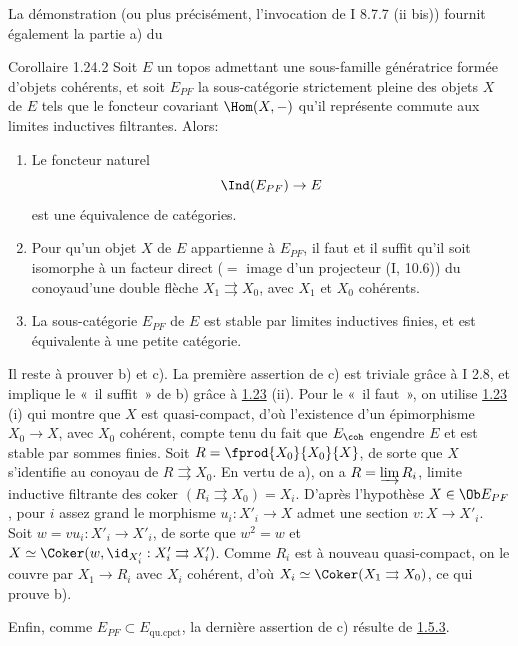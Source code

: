 La démonstration (ou plus précisément, l'invocation de I 8.7.7 (ii
bis)) fournit également la partie a) du

\begin{enonce*}{Corollaire 1.24.2}
Soit $E$ un topos admettant une sous-famille génératrice formée
d'objets cohérents, et soit $E_{PF}$ la sous-catégorie strictement
pleine des objets $X$ de $E$ tels que le foncteur covariant $\Hom(X,
-)$ qu'il représente commute aux limites inductives filtrantes.
Alors:
\begin{enumerate}
\renewcommand{\theenumi}{\alph{enumi}}
\renewcommand{\labelenumi}{\theenumi)}
\item Le foncteur naturel
$$
\Ind (E_{PF}) \to E
$$
est une équivalence de catégories.

\item Pour qu'un objet $X$ de $E$ appartienne à $E_{PF}$, il faut et
  il suffit qu'il soit isomorphe à un facteur direct ($=$ image d'un
  projecteur (I, 10.6)) du conoyau\pageoriginale d'une double flèche $X_1
  \rightrightarrows X_0$, avec $X_1$ et $X_0$ cohérents.
\item La sous-catégorie $E_{PF}$ de $E$ est stable par limites
  inductives finies, et est équivalente à une petite catégorie.
\end{enumerate}
\end{enonce*}

Il reste à prouver b) et c). La première assertion de c) est triviale
grâce à I 2.8, et implique le « il suffit » de b) grâce à \hyperref[VI.thm1.23]{1.23}
(ii). Pour le « il faut », on utilise \hyperref[VI.thm1.23]{1.23} (i) qui montre que $X$
est quasi-compact, d'où l'existence d'un épimorphisme $X_{0} \to X$, avec
$X_0$ cohérent, compte tenu du fait que $E_{\coh}$ engendre $E$ et est
stable par sommes finies. Soit $R = \fprod{X_0}{X_0}{X}$, de sorte que
$X$ s'identifie au conoyau de $R \rightrightarrows X_0$. En vertu de
a), on a $R = \varinjlim R_i$, limite inductive filtrante des coker
$(R_i \rightrightarrows X_0) = X_i$. D'après l'hypothèse $X \in \Ob
E_{PF}$, pour $i$ assez grand le morphisme $u_i : X'_i \to X$ admet
une section $v : X \to X'_i$. Soit $w = vu_i : X'_i \to
X'_i$, de sorte que $w^2 = w$ et $X \simeq \Coker (w, \id_{X'_i}
: X'_i \rightrightarrows X'_i)$. Comme $R_i$ est à nouveau
quasi-compact, on le couvre par $X_{1} \to R_i$ avec $X_i$
cohérent, d'où $X_i \simeq \Coker (X_1 \rightrightarrows X_0)$, ce qui
prouve b).

Enfin, comme $E_{PF}\subset E_{\text{qu.cpct}}$, la dernière assertion de c)
résulte de \hyperref[VI.subsubsec1.5.3]{1.5.3}.

